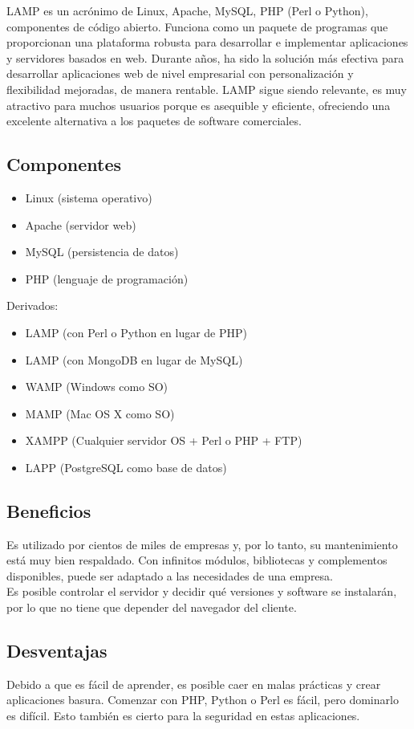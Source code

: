 LAMP es un acrónimo de Linux, Apache, MySQL, PHP (Perl o Python), componentes de código abierto. Funciona como un paquete de programas que proporcionan una plataforma robusta para desarrollar e implementar aplicaciones y servidores basados en web. Durante años, ha sido la solución más efectiva para desarrollar aplicaciones web de nivel empresarial con personalización y flexibilidad mejoradas, de manera rentable. LAMP sigue siendo relevante, es muy atractivo para muchos usuarios porque es asequible y eficiente, ofreciendo una excelente alternativa a los paquetes de software comerciales. 
\subsection{Componentes}
\begin{itemize}
  \item Linux (sistema operativo)
  \item Apache (servidor web)
  \item MySQL (persistencia de datos)
  \item PHP (lenguaje de programación)
\end{itemize}

Derivados:

\begin{itemize}
  \item LAMP (con Perl o Python en lugar de PHP)
  \item LAMP (con MongoDB en lugar de MySQL)
  \item WAMP (Windows como SO)
  \item MAMP (Mac OS X como SO)
  \item XAMPP (Cualquier servidor OS + Perl o PHP + FTP)
  \item LAPP (PostgreSQL como base de datos)
\end{itemize}

\subsection{Beneficios}
Es utilizado por cientos de miles de empresas y, por lo tanto, su mantenimiento está muy bien respaldado. Con infinitos módulos, bibliotecas y complementos disponibles, puede ser adaptado a las necesidades de una empresa.\\[0.8cm]
Es posible controlar el servidor y decidir qué versiones y software se instalarán, por lo que no tiene que depender del navegador del cliente.
\subsection{Desventajas}
Debido a que es fácil de aprender, es posible caer en malas prácticas y crear aplicaciones basura. Comenzar con PHP, Python o Perl es fácil, pero dominarlo es difícil. Esto también es cierto para la seguridad en estas aplicaciones.